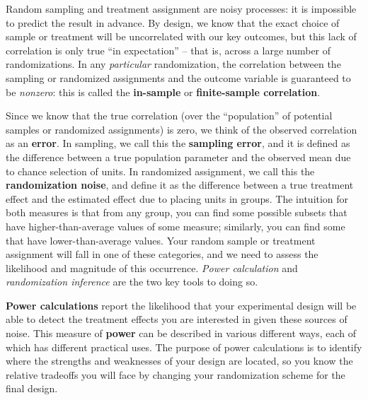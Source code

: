 Random sampling and treatment assignment are noisy processes:
it is impossible to predict the result in advance.
By design, we know that the exact choice of sample or treatment
will be uncorrelated with our key outcomes,
but this lack of correlation is only true ``in expectation'' --
that is, across a large number of randomizations.
In any \textit{particular} randomization,
the correlation between the sampling or randomized assignments and the outcome variable
is guaranteed to be \textit{nonzero}:
this is called the \textbf{in-sample} or \textbf{finite-sample correlation}.

Since we know that the true correlation
(over the ``population'' of potential samples or randomized assignments)
is zero, we think of the observed correlation as an \textbf{error}.
In sampling, we call this the \textbf{sampling error},
and it is defined as the difference between a true population parameter
and the observed mean due to chance selection of units.
In randomized assignment, we call this the \textbf{randomization noise},
and define it as the difference between a true treatment effect
and the estimated effect due to placing units in groups.
The intuition for both measures is that from any group,
you can find some possible subsets that have higher-than-average values of some measure;
similarly, you can find some that have lower-than-average values.
Your random sample or treatment assignment will fall in one of these categories,
and we need to assess the likelihood and magnitude of this occurrence.
\textit{Power calculation} and \textit{randomization inference} are the two key tools to doing so.

\textbf{Power calculations} report the likelihood that your experimental design
will be able to detect the treatment effects you are interested in
given these sources of noise.
This measure of \textbf{power} can be described in various different ways,
each of which has different practical uses.
The purpose of power calculations is to identify where the strengths and weaknesses
of your design are located, so you know the relative tradeoffs you will face
by changing your randomization scheme for the final design.

